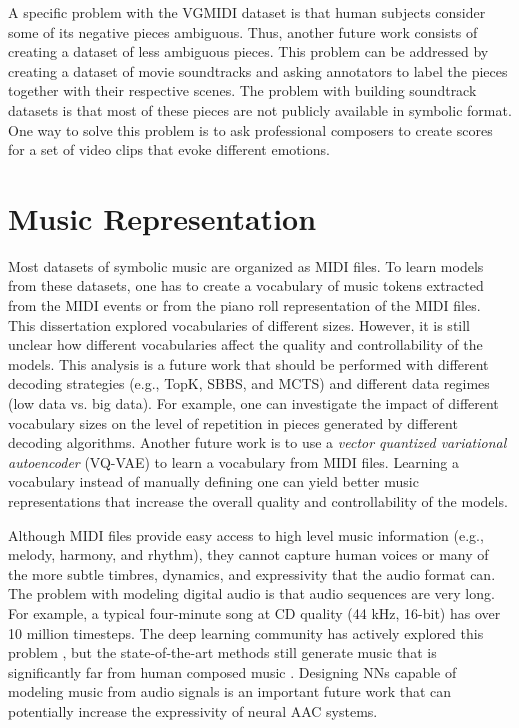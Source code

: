 A specific problem with the VGMIDI dataset is that human subjects consider some of its negative pieces ambiguous. Thus, another future work consists of creating a dataset of less ambiguous pieces. This problem can be addressed by creating a dataset of movie soundtracks and asking annotators to label the pieces together with their respective scenes. The problem with building soundtrack datasets is that most of these pieces are not publicly available in symbolic format. One way to solve this problem is to ask professional composers to create scores for a set of video clips that evoke different emotions.

\section{Music Representation}

Most datasets of symbolic music are organized as MIDI files. To learn models from these datasets, one has to create a vocabulary of music tokens extracted from the MIDI events or from the piano roll representation of the MIDI files. This dissertation explored vocabularies of different sizes. However, it is still unclear how different vocabularies affect the quality and controllability of the models. This analysis is a future work that should be performed with different decoding strategies (e.g., TopK, SBBS, and MCTS) and different data regimes (low data vs. big data). For example, one can investigate the impact of different vocabulary sizes on the level of repetition in pieces generated by different decoding algorithms. Another future work is to use a \textit{vector quantized variational autoencoder} (VQ-VAE) to learn a vocabulary from MIDI files. Learning a vocabulary instead of manually defining one can yield better music representations that increase the overall quality and controllability of the models.

Although MIDI files provide easy access to high level music information (e.g., melody, harmony, and rhythm), they cannot capture human voices or many of the more subtle timbres, dynamics, and expressivity that the audio format can. The problem with modeling digital audio is that audio sequences are very long. For example, a typical four-minute song at CD quality (44 kHz, 16-bit) has over 10 million timesteps. The deep learning community has actively explored this problem \cite{oord2016wavenet, mehri2016samplernn, yamamoto2020parallel}, but the state-of-the-art methods still generate music that is significantly far from human composed music \cite{dhariwal2020jukebox}. Designing NNs capable of modeling music from audio signals is an important future work that can potentially increase the expressivity of neural AAC systems.

